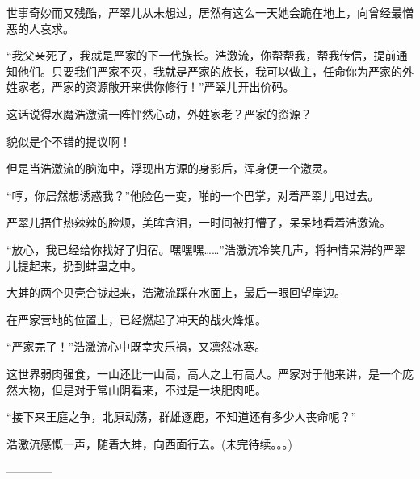 \begin{this_body}
世事奇妙而又残酷，严翠儿从未想过，居然有这么一天她会跪在地上，向曾经最憎恶的人哀求。

“我父亲死了，我就是严家的下一代族长。浩激流，你帮帮我，帮我传信，提前通知他们。只要我们严家不灭，我就是严家的族长，我可以做主，任命你为严家的外姓家老，严家的资源敞开来供你修行！”严翠儿开出价码。

这话说得水魔浩激流一阵怦然心动，外姓家老？严家的资源？

貌似是个不错的提议啊！

但是当浩激流的脑海中，浮现出方源的身影后，浑身便一个激灵。

“哼，你居然想诱惑我？”他脸色一变，啪的一个巴掌，对着严翠儿甩过去。

严翠儿捂住热辣辣的脸颊，美眸含泪，一时间被打懵了，呆呆地看着浩激流。

“放心，我已经给你找好了归宿。嘿嘿嘿……”浩激流冷笑几声，将神情呆滞的严翠儿提起来，扔到蚌蛊之中。

大蚌的两个贝壳合拢起来，浩激流踩在水面上，最后一眼回望岸边。

在严家营地的位置上，已经燃起了冲天的战火烽烟。

“严家完了！”浩激流心中既幸灾乐祸，又凛然冰寒。

这世界弱肉强食，一山还比一山高，高人之上有高人。严家对于他来讲，是一个庞然大物，但是对于常山阴看来，不过是一块肥肉吧。

“接下来王庭之争，北原动荡，群雄逐鹿，不知道还有多少人丧命呢？”

浩激流感慨一声，随着大蚌，向西面行去。(未完待续。。。)

------------

\end{this_body}


